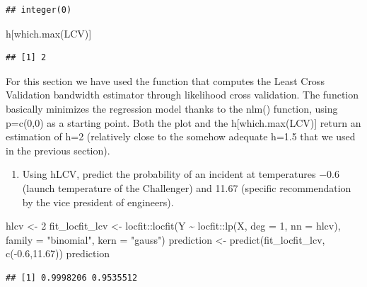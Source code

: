 \documentclass[
]{article}
\newenvironment{Shaded}{\begin{snugshade}}{\end{snugshade}}
\newcommand{\AttributeTok}[1]{\textcolor[rgb]{0.77,0.63,0.00}{#1}}
\newcommand{\DecValTok}[1]{\textcolor[rgb]{0.00,0.00,0.81}{#1}}
\newcommand{\FloatTok}[1]{\textcolor[rgb]{0.00,0.00,0.81}{#1}}
\newcommand{\FunctionTok}[1]{\textcolor[rgb]{0.00,0.00,0.00}{#1}}
\newcommand{\NormalTok}[1]{#1}
\newcommand{\OtherTok}[1]{\textcolor[rgb]{0.56,0.35,0.01}{#1}}
\newcommand{\SpecialCharTok}[1]{\textcolor[rgb]{0.00,0.00,0.00}{#1}}
\newcommand{\StringTok}[1]{\textcolor[rgb]{0.31,0.60,0.02}{#1}}
\providecommand{\tightlist}{%
  \setlength{\itemsep}{0pt}\setlength{\parskip}{0pt}}
\begin{document}
\begin{verbatim}
## integer(0)
\end{verbatim}

\begin{Shaded}
\begin{Highlighting}[]
\NormalTok{h[}\FunctionTok{which.max}\NormalTok{(LCV)]}
\end{Highlighting}
\end{Shaded}

\begin{verbatim}
## [1] 2
\end{verbatim}

For this section we have used the function that computes the Least Cross
Validation bandwidth estimator through likelihood cross validation. The
function basically minimizes the regression model thanks to the nlm()
function, using p=c(0,0) as a starting point. Both the plot and the
h{[}which.max(LCV){]} return an estimation of h=2 (relatively close to
the somehow adequate h=1.5 that we used in the previous section).

\begin{enumerate}
\def\labelenumi{\alph{enumi}.}
\setcounter{enumi}{2}
\tightlist
\item
  Using hLCV, predict the probability of an incident at temperatures
  −0.6 (launch temperature of the Challenger) and 11.67 (specific
  recommendation by the vice president of engineers).
\end{enumerate}

\begin{Shaded}
\begin{Highlighting}[]
\NormalTok{hlcv }\OtherTok{\textless{}{-}} \DecValTok{2}
\NormalTok{fit\_locfit\_lcv }\OtherTok{\textless{}{-}}\NormalTok{ locfit}\SpecialCharTok{::}\FunctionTok{locfit}\NormalTok{(Y }\SpecialCharTok{\textasciitilde{}}\NormalTok{ locfit}\SpecialCharTok{::}\FunctionTok{lp}\NormalTok{(X, }\AttributeTok{deg =} \DecValTok{1}\NormalTok{, }\AttributeTok{nn =}\NormalTok{ hlcv),}
                             \AttributeTok{family =} \StringTok{"binomial"}\NormalTok{, }\AttributeTok{kern =} \StringTok{"gauss"}\NormalTok{)}
\NormalTok{prediction }\OtherTok{\textless{}{-}} \FunctionTok{predict}\NormalTok{(fit\_locfit\_lcv, }\FunctionTok{c}\NormalTok{(}\SpecialCharTok{{-}}\FloatTok{0.6}\NormalTok{,}\FloatTok{11.67}\NormalTok{))}
\NormalTok{prediction}
\end{Highlighting}
\end{Shaded}

\begin{verbatim}
## [1] 0.9998206 0.9535512
\end{verbatim}
\end{document}
